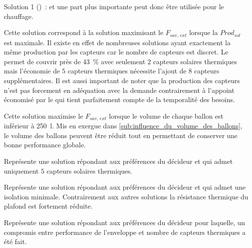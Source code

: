 \begin{blockdescription}{Solution 1 ()~:}
                                 et une part plus importante peut donc être utilisée pour le chauffage.
  \item[Solution 4 (\abr{S4})~:] Cette solution correspond à la solution maximisant le $F_{sav,\,ext}$ lorsque
                                 la $Prod_{sol}$ est maximale. Il existe en effet de nombreuses solutions ayant exactement
                                 la même production par les capteurs  car le nombre de capteurs est discret.
                                 Le  permet de couvrir près de \SI{43}{\percent} avec seulement $2$ capteurs
                                 solaires thermiques mais l’économie de $5$ capteurs thermiques nécessite l’ajout
                                 de $8$ capteurs  supplémentaires. Il est aussi important de noter que
                                 la production des capteurs n’est pas forcement en adéquation avec la demande
                                 contrairement à l’appoint économisé par le  qui tient parfaitement compte
                                 de la temporalité des besoins.
  \item[Solution 5 (\abr{S5})~:] Cette solution maximise le $F_{sav,\,ext}$ lorsque le volume de chaque
                                 ballon est inférieur à \SI{250}{\litre}. Mis en exergue dans
                                 \ref{sub:influence_du_volume_des_ballons},
                                 le volume des ballons peuvent être réduit tout en permettant de
                                 conserver une bonne performance globale.
  \item[Solution 6 (\abr{S6})~:] Représente une solution répondant aux préférences du décideur
                                 et qui admet uniquement $5$ capteurs solaires thermiques.
  \item[Solution 7 (\abr{S7})~:] Représente une solution répondant aux préférences du décideur
                                 et qui admet une isolation minimale. Contrairement aux autres
                                 solutions la résistance thermique du plafond est fortement réduite.
  \item[Solution 8 (\abr{S8})~:] Représente une solution répondant aux préférences du décideur
                                 pour laquelle, un compromis entre performance de l’enveloppe
                                 et nombre de capteurs thermiques a été fait.
\end{blockdescription}

